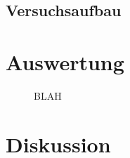 \documentclass[12pt,a4paper,titlepage,headinclude]{scrartcl}
\begin{document}
\subsection{Versuchsaufbau}

\section{Auswertung}
\label{sec:auswertung}
\begin{figure}[h!]
	\centering
	
	\caption{BLAH}
	\label{fig:zeiger2}
\end{figure}

\section{Diskussion}
\label{sec:diskussion}

\newpage
\printbibliography[heading=bibintoc]
\end{document}
